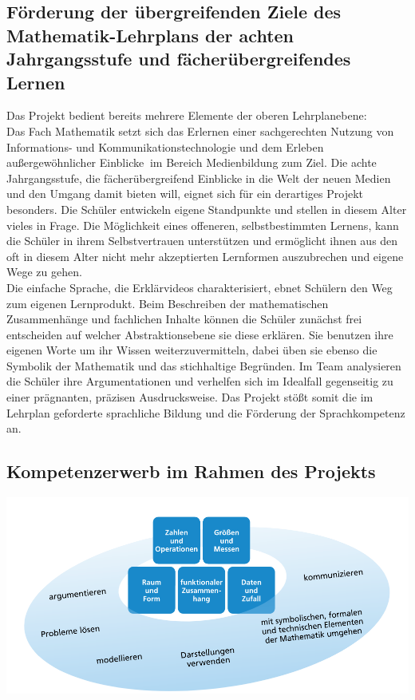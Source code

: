 \documentclass[a4paper,12pt,twoside=false]{scrartcl}
\begin{document}
\subsection{Förderung der übergreifenden Ziele des Mathematik-Lehrplans der achten Jahrgangsstufe und fächerübergreifendes Lernen}
Das Projekt bedient bereits mehrere Elemente der oberen Lehrplanebene: \\Das Fach Mathematik setzt sich das \glqq Erlernen einer sachgerechten Nutzung von Informations- und Kommunikationstechnologie und dem Erleben außergewöhnlicher Einblicke\grqq$~$ im Bereich Medienbildung zum Ziel. Die achte Jahrgangsstufe, die fächerübergreifend Einblicke in die Welt der neuen Medien und den Umgang damit bieten will, eignet sich für ein derartiges Projekt besonders. Die Schüler entwickeln eigene Standpunkte und stellen in diesem Alter vieles in Frage. Die Möglichkeit eines offeneren, selbstbestimmten Lernens, kann die Schüler in ihrem Selbstvertrauen unterstützen und ermöglicht ihnen aus den oft in diesem Alter nicht mehr akzeptierten Lernformen auszubrechen und eigene Wege zu gehen.  \\
Die einfache Sprache, die Erklärvideos charakterisiert, ebnet Schülern den Weg zum eigenen Lernprodukt. Beim Beschreiben der mathematischen Zusammenhänge und fachlichen Inhalte können die Schüler zunächst frei entscheiden auf welcher Abstraktionsebene sie diese erklären. Sie benutzen ihre eigenen Worte um ihr Wissen weiterzuvermitteln, dabei üben sie ebenso die Symbolik der Mathematik und das stichhaltige Begründen. Im Team analysieren die Schüler ihre Argumentationen und verhelfen sich im Idealfall gegenseitig zu einer prägnanten, präzisen Ausdrucksweise. Das Projekt stößt somit die im Lehrplan geforderte sprachliche Bildung und die Förderung der Sprachkompetenz an. \\
\subsection{Kompetenzerwerb im Rahmen des Projekts}
\includegraphics[scale = 0.6]{Kompetenzstrukturmodell.png}\\
\end{document}
